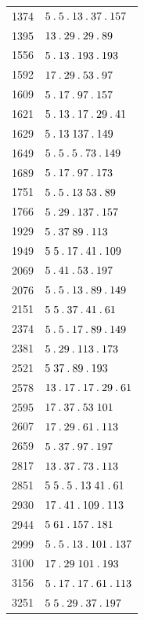 %
\begingroup\small\setlength{\tabcolsep}{5pt}
\begin{longtable}{@{}r|l@{}}
1374 & $5\mathbin{.} 5\mathbin{.} 13\mathbin{.} 37\mathbin{.} 157$\\
1395 & $13\mathbin{.} 29\mathbin{.} 29\mathbin{.} 89$\\
1556 & $5\mathbin{.} 13\mathbin{.} 193\mathbin{.} 193$\\
1592 & $17\mathbin{.} 29\mathbin{.} 53\mathbin{.} 97$\\
1609 & $5\mathbin{.} 17\mathbin{.} 97\mathbin{.} 157$\\
1621 & $5\mathbin{.} 13\mathbin{.} 17\mathbin{.} 29\mathbin{.} 41$\\
1629 & $5\mathbin{.} 13\;137\mathbin{.} 149$\\
1649 & $5\mathbin{.} 5\mathbin{.} 5\mathbin{.} 73\mathbin{.} 149$\\
1689 & $5\mathbin{.} 17\mathbin{.} 97\mathbin{.} 173$\\
1751 & $5\mathbin{.} 5\mathbin{.} 13\;53\mathbin{.} 89$\\
1766 & $5\mathbin{.} 29\mathbin{.} 137\mathbin{.} 157$\\
1929 & $5\mathbin{.} 37\;89\mathbin{.} 113$\\
1949 & $5\;5\mathbin{.} 17\mathbin{.} 41\mathbin{.} 109$\\
2069 & $5\mathbin{.} 41\mathbin{.} 53\mathbin{.} 197$\\
2076 & $5\mathbin{.} 5\mathbin{.} 13\mathbin{.} 89\mathbin{.} 149$\\
2151 & $5\;5\mathbin{.} 37\mathbin{.} 41\mathbin{.} 61$\\
2374 & $5\mathbin{.} 5\mathbin{.} 17\mathbin{.} 89\mathbin{.} 149$\\
2381 & $5\mathbin{.} 29\mathbin{.} 113\mathbin{.} 173$\\
2521 & $5\;37\mathbin{.} 89\mathbin{.} 193$\\
2578 & $13\mathbin{.} 17\mathbin{.} 17\mathbin{.} 29\mathbin{.} 61$\\
2595 & $17\mathbin{.} 37\mathbin{.} 53\;101$\\
2607 & $17\mathbin{.} 29\mathbin{.} 61\mathbin{.} 113$\\
2659 & $5\mathbin{.} 37\mathbin{.} 97\mathbin{.} 197$\\
2817 & $13\mathbin{.} 37\mathbin{.} 73\mathbin{.} 113$\\
2851 & $5\;5\mathbin{.} 5\mathbin{.} 13\;41\mathbin{.} 61$\\
2930 & $17\mathbin{.} 41\mathbin{.} 109\mathbin{.} 113$\\
2944 & $5\;61\mathbin{.} 157\mathbin{.} 181$\\
2999 & $5\mathbin{.} 5\mathbin{.} 13\mathbin{.} 101\mathbin{.} 137$\\
3100 & $17\mathbin{.} 29\;101\mathbin{.} 193$\\
3156 & $5\mathbin{.} 17\mathbin{.} 17\mathbin{.} 61\mathbin{.} 113$\\
3251 & $5\;5\mathbin{.} 29\mathbin{.} 37\mathbin{.} 197$\\

\end{longtable}
